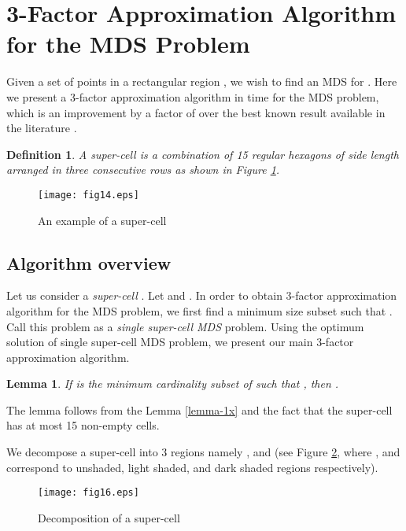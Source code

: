 \documentclass[a4paper,11pt]{article}
\newtheorem{lemma}{Lemma}
\newtheorem{definition}{Definition}
\newenvironment{proof}{\noindent {\bf Proof:\,\ }}{\hfill\mbox{\
}\smallskip}
\begin{document}
\section{3-Factor Approximation Algorithm for the MDS Problem}\label{3factor}
Given a set  of  points in a rectangular region , we wish to find an MDS for . 
Here we present a 3-factor approximation algorithm in  time for the MDS 
problem, which is an improvement by a factor of  over the best known result available in 
the literature \cite{DDCN13}. 

\begin{definition}
A {\it super-cell} is a combination of 15 regular hexagons of side length  arranged 
in three consecutive rows as shown in Figure \ref{fig:fig14}. 
\end{definition}

\begin{figure}[ht]
\begin{center}
\texttt{[image: fig14.eps]}
\caption{An example of a super-cell}
\label{fig:fig14}
\end{center}
\end{figure}

\subsection{Algorithm overview}
Let us consider a {\it super-cell} . Let  and . 
In order to obtain 3-factor approximation algorithm for the MDS problem, we first find a minimum 
size subset  such that . Call this problem 
as a {\it single super-cell MDS} problem. Using the optimum solution of single super-cell MDS problem, we 
present our main 3-factor approximation algorithm. 

\begin{lemma} \label{lemma-5x}
If  is the minimum cardinality subset of  such that 
, then .
\end{lemma}

\begin{proof}
The lemma follows from the Lemma \ref{lemma-1x} and the fact that the super-cell  
has at most 15 non-empty cells.
\end{proof}

We decompose a super-cell  into 3 regions namely , and  
(see Figure \ref{fig:fig16},  where , and  correspond to unshaded, 
light shaded, and dark shaded regions respectively). 

\begin{figure}[ht]
\begin{center}
\texttt{[image: fig16.eps]}
\caption{Decomposition of a super-cell}
\label{fig:fig16}
\end{center}
\end{figure}
\end{document}
